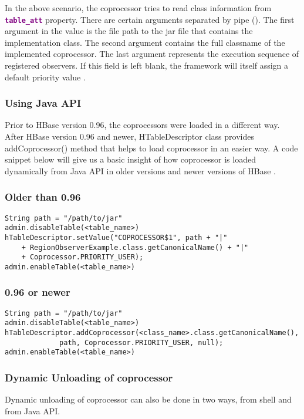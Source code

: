 \documentclass[11pt,a4paper,bibtotoc,idxtotoc,headsepline,footsepline,footexclude,BCOR12mm,DIV13]{scrbook}
\begin{document}
In the above scenario, the coprocessor tries to read class information from \textbf{\textcolor{purple}{\texttt{table\_att}}} property. There are certain arguments separated by pipe (\text{\textbar}). The first argument in the value is the file path to the jar file that contains the implementation class. The second argument contains the full classname of the implemented coprocessor. The last argument represents the execution sequence of registered observers. If this field is left blank, the framework will itself assign a default priority value \cite{hbase:site}.

\subsubsection{Using Java API}
Prior to HBase version 0.96, the coprocessors were loaded in a different way. After HBase version 0.96 and newer, HTableDescriptor class provides addCoprocessor() method that helps to load coprocessor in an easier way. A code snippet below will give us a basic insight of how coprocessor is loaded dynamically from Java API in older versions and newer versions of HBase \cite{loading:coprocessors} .

\subsubsection{Older than 0.96}
\lstset{language=Java}
\begin{lstlisting}
String path = "/path/to/jar"
admin.disableTable(<table_name>)
hTableDescriptor.setValue("COPROCESSOR$1", path + "|"
    + RegionObserverExample.class.getCanonicalName() + "|"
    + Coprocessor.PRIORITY_USER);
admin.enableTable(<table_name>)
\end{lstlisting}

\subsubsection{0.96 or newer} 
\lstset{language=Java}
\begin{lstlisting}
String path = "/path/to/jar"
admin.disableTable(<table_name>)
hTableDescriptor.addCoprocessor(<class_name>.class.getCanonicalName(),
             path, Coprocessor.PRIORITY_USER, null);
admin.enableTable(<table_name>)
\end{lstlisting}

\subsubsection{Dynamic Unloading of coprocessor}
Dynamic unloading of coprocessor can also be done in two ways, from shell and from Java API. 
\end{document}
